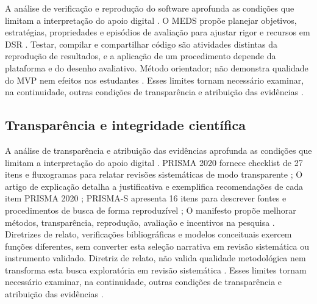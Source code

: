 A análise de verificação e reprodução do software aprofunda as condições que limitam a interpretação do apoio digital \citep{eng20}. O MEDS propõe planejar objetivos, estratégias, propriedades e episódios de avaliação para ajustar rigor e recursos em DSR \citep{eng20}. Testar, compilar e compartilhar código são atividades distintas da reprodução de resultados, e a aplicação de um procedimento depende da plataforma e do desenho avaliativo. Método orientador; não demonstra qualidade do MVP nem efeitos nos estudantes \citep{eng20}. Esses limites tornam necessário examinar, na continuidade, outras condições de transparência e atribuição das evidências \citep{eng20}.

\clearpage\subsection*{Transparência e integridade científica}

A análise de transparência e atribuição das evidências aprofunda as condições que limitam a interpretação do apoio digital \citep{SU01} \citep{SU02} \citep{SU03} \citep{SU04}. PRISMA 2020 fornece checklist de 27 itens e fluxogramas para relatar revisões sistemáticas de modo transparente \citep{SU01}; O artigo de explicação detalha a justificativa e exemplifica recomendações de cada item PRISMA 2020 \citep{SU02}; PRISMA-S apresenta 16 itens para descrever fontes e procedimentos de busca de forma reproduzível \citep{SU03}; O manifesto propõe melhorar métodos, transparência, reprodução, avaliação e incentivos na pesquisa \citep{SU04}. Diretrizes de relato, verificações bibliográficas e modelos conceituais exercem funções diferentes, sem converter esta seleção narrativa em revisão sistemática ou instrumento validado. Diretriz de relato, não valida qualidade metodológica nem transforma esta busca exploratória em revisão sistemática \citep{SU01} \citep{SU02} \citep{SU03} \citep{SU04}. Esses limites tornam necessário examinar, na continuidade, outras condições de transparência e atribuição das evidências \citep{SU01} \citep{SU02} \citep{SU03} \citep{SU04}.

